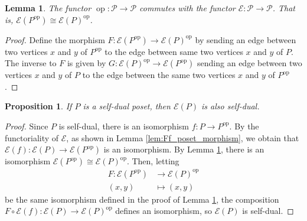\documentclass[smallextended, envcountsame, numbook]{svjour3}
\theoremstyle{plain}
\newtheorem{prop}[thm]{Proposition}
\newtheorem{lem}[thm]{Lemma}
\theoremstyle{definition}
\theoremstyle{remark}
\numberwithin{equation}{section}
\newcommand\op{\operatorname{op}}
\begin{document}
\begin{lem}
\label{lem:commuting_op_e}
The functor $\op\colon\mathcal P \rightarrow \mathcal P$ commutes with the functor $\mathcal E\colon\mathcal P \rightarrow \mathcal P$. That is, $\mathcal E(P^{\op}) \cong \mathcal E(P)^{\op}$.
\end{lem}

\begin{proof}
Define the morphism  $F\colon\mathcal E(P^{\op}) \rightarrow \mathcal E(P)^{\op}$ by sending an edge between two vertices $x$ and $y$ of $P^{\op}$ to the edge between same two vertices $x$ and $y$ of $P$. The inverse to $F$ is given by $G\colon\mathcal E(P)^{\op} \rightarrow \mathcal E(P^{\op})$ sending an edge between two vertices $x$ and $y$ of $P$ to the edge between the same two vertices $x$ and $y$ of $P^{\op}$. 
\end{proof}



\begin{prop}
\label{prop:self_dual_preservation}
If $P$ is a self-dual poset, then $\mathcal E(P)$ is also self-dual.
\end{prop}
\begin{proof}
Since $P$ is self-dual, there is an isomorphism $f\colon P \rightarrow P^{\op}$. By the  functoriality of $\mathcal E$, as shown in Lemma \ref{lem:Ff_poset_morphism}, we obtain that $\mathcal E(f)\colon\mathcal E(P) \rightarrow \mathcal E(P^{\op})$ is an isomorphism. By Lemma \ref{lem:commuting_op_e}, there is an isomorphism $\mathcal E(P^{\op}) \cong \mathcal E(P)^{\op}$. Then, letting 
\begin{align*}
F\colon\mathcal E(P^{\op}) &\rightarrow \mathcal E(P)^{\op}\\
(x,y) &\mapsto (x,y)
\end{align*}
be the same isomorphism defined in the proof of Lemma \ref{lem:commuting_op_e}, the composition $F\circ \mathcal E(f)\colon\mathcal E(P) \rightarrow \mathcal E(P)^{\op}$ defines an isomorphism, so $\mathcal E(P)$ is self-dual.
\end{proof}
\end{document}

